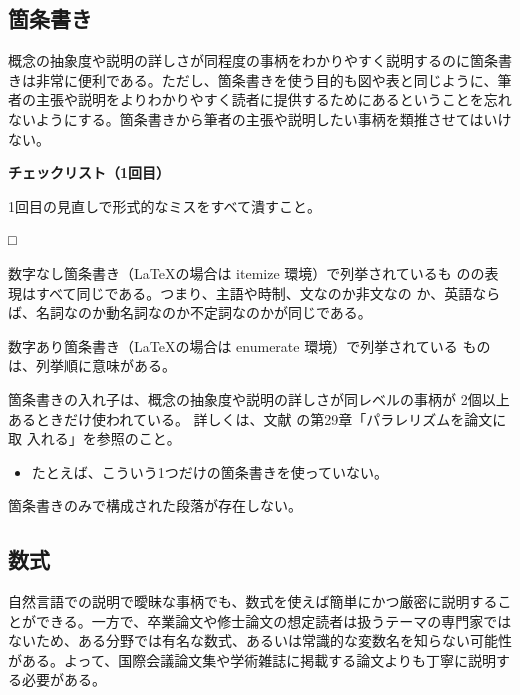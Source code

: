 \documentclass[11pt,a4j]{jsarticle}
\begin{document}
\subsection{箇条書き}

概念の抽象度や説明の詳しさが同程度の事柄をわかりやすく説明するのに箇条書
きは非常に便利である。ただし、箇条書きを使う目的も図や表と同じように、筆
者の主張や説明をよりわかりやすく読者に提供するためにあるということを忘れ
ないようにする。箇条書きから筆者の主張や説明したい事柄を類推させてはいけ
ない。

\begin{flushleft}
 {\bf チェックリスト（1回目）}
\end{flushleft}
1回目の見直しで形式的なミスをすべて潰すこと。
\begin{list}%
 {□} %
 {} %
 \item 数字なし箇条書き（LaTeXの場合は itemize 環境）で列挙されているも
       のの表現はすべて同じである。つまり、主語や時制、文なのか非文なの
       か、英語ならば、名詞なのか動名詞なのか不定詞なのかが同じである。
 \item 数字あり箇条書き（LaTeXの場合は enumerate 環境）で列挙されている
       ものは、列挙順に意味がある。
 \item 箇条書きの入れ子は、概念の抽象度や説明の詳しさが同レベルの事柄が
       2個以上あるときだけ使われている。 詳しくは、文献
       \cite{R.M.Lewis_HowToWrite_Ja_04}の第29章「パラレリズムを論文に取
       入れる」を参照のこと。
       \begin{itemize}
	\item たとえば、こういう1つだけの箇条書きを使っていない。
       \end{itemize}
 \item 箇条書きのみで構成された段落が存在しない。
\end{list}

\subsection{数式}

自然言語での説明で曖昧な事柄でも、数式を使えば簡単にかつ厳密に説明するこ
とができる。一方で、卒業論文や修士論文の想定読者は扱うテーマの専門家では
ないため、ある分野では有名な数式、あるいは常識的な変数名を知らない可能性
がある。よって、国際会議論文集や学術雑誌に掲載する論文よりも丁寧に説明す
る必要がある。
\end{document}
